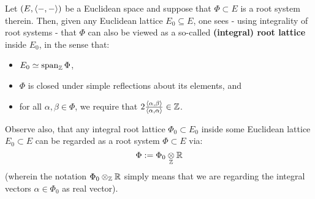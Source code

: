             \begin{remark} \label{remark: root_lattices}
                Let $(E, \langle-, -\rangle)$ be a Euclidean space and suppose that $\Phi \subset E$ is a root system therein. Then, given any Euclidean lattice $E_0 \subseteq E$, one sees - using integrality of root systems - that $\Phi$ can also be viewed as a so-called \textbf{(integral) root lattice} inside $E_0$, in the sense that:
                    \begin{itemize}
                        \item $E_0 \simeq \operatorname{span}_{\mathbb{Z}} \Phi$,
                        \item $\Phi$ is closed under simple reflections about its elements, and
                        \item for all $\alpha, \beta \in \Phi$, we require that $2\frac{\langle\alpha, \beta\rangle}{\langle\alpha, \alpha\rangle} \in \mathbb{Z}$.
                    \end{itemize}
                Observe also, that any integral root lattice $\Phi_0 \subset E_0$ inside some Euclidean lattice $E_0 \subset E$ can be regarded as a root system $\Phi \subset E$ via:
                    $$\Phi := \Phi_0 \tensor_{\Z} \R$$
                (wherein the notation $\Phi_0 \tensor_{\Z} \R$ simply means that we are regarding the integral vectors $\alpha \in \Phi_0$ as real vector).
            \end{remark}
